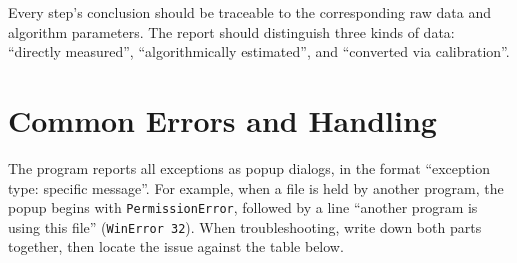 \documentclass[UTF8,a4paper,12pt]{ctexart}
\begin{document}
Every step's conclusion should be traceable to the corresponding raw data and algorithm parameters. The report should distinguish three kinds of data: ``directly measured'', ``algorithmically estimated'', and ``converted via calibration''.

\section{Common Errors and Handling}

The program reports all exceptions as popup dialogs, in the format ``exception type: specific message''. For example, when a file is held by another program, the popup begins with \texttt{PermissionError}, followed by a line ``another program is using this file'' (\texttt{WinError 32}). When troubleshooting, write down both parts together, then locate the issue against the table below.
\end{document}
